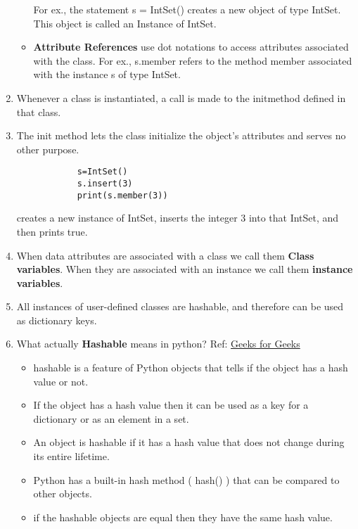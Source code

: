 \documentclass[11pt]{article}
\begin{document}
\begin{enumerate}
\begin{itemize}
            For ex., the statement s = IntSet() creates a new object of type IntSet. This object is called an Instance of IntSet.
            \item \textbf{Attribute References} use dot notations to access attributes associated with the class. For ex., s.member refers to the method member associated with the instance s of type IntSet.
        \end{itemize}
        \item Whenever a class is instantiated, a call is made to the \textunderscore\textunderscore init\textunderscore\textunderscore method defined in that class.
        \item The \textunderscore\textunderscore init \textunderscore\textunderscore  method lets the class initialize the object's attributes and serves no other purpose.
        \begin{verbatim}
            s=IntSet()
            s.insert(3)
            print(s.member(3))
        \end{verbatim}
        creates a new instance of IntSet, inserts the integer 3 into that IntSet, and then prints true.
        \item When data attributes are associated with a class we call them \textbf{Class variables}. When they are associated with an instance we call them \textbf{instance variables}.
        \item All instances of user-defined classes are hashable, and therefore can be used as dictionary keys.
        \item What actually \textbf{Hashable} means in python? Ref: \href{https://www.geeksforgeeks.org/why-and-how-are-python-functions-hashable/}{Geeks for Geeks}
        \begin{itemize}
            \item hashable is a feature of Python objects that tells if the object has a hash value or not.
            \item If the object has a hash value then it can be used as a key for a dictionary or as an element in a set.
            \item An object is hashable if it has a hash value that does not change during its entire lifetime.
            \item Python has a built-in hash method ( \textunderscore\textunderscore hash\textunderscore\textunderscore() ) that can be compared to other objects.
            \item if the hashable objects are equal then they have the same hash value.

\end{itemize}
\end{enumerate}
\end{document}
